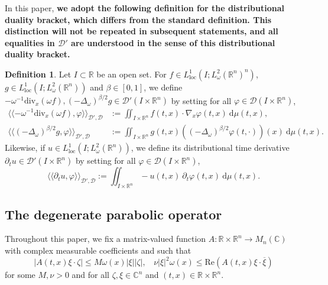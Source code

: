 \documentclass[12pt, letterpaper]{amsart}
\theoremstyle{definition}
\newtheorem{defn}[thm]{Definition}
\theoremstyle{remark}
\newcommand{\llangle}{\langle\!\langle}
\newcommand{\rrangle}{\rangle\!\rangle}
\numberwithin{equation}{section}
\begin{document}
In this paper, \textbf{we adopt the following definition for the distributional duality bracket, which differs from the standard definition. This distinction will not be repeated in subsequent statements, and all equalities in $\mathcal{D'}$ are understood in the sense of this distributional duality bracket.}  
\begin{defn}
    Let $I \subset \mathbb{R}$ be an open set. For $f \in L^{1}_{\mathrm{loc}}(I;L^2_\omega(\mathbb{R}^n)^n)$, $g \in L^{1}_{\mathrm{loc}}(I;L^2_\omega(\mathbb{R}^n))$ and $\beta \in [0,1]$, we define $- \omega^{-1} \mathrm{div}_x(\omega f), (-\Delta_\omega)^{\beta/2}g \in \mathcal{D'}(I\times \mathbb{R}^n)$ by setting for all $\varphi \in \mathcal{D}(I \times \mathbb{R}^n)$,
\begin{align*}
    \llangle - \omega^{-1} \mathrm{div}_x(\omega f) , \varphi \rrangle_{\mathcal{D}',\mathcal{D}}&:=\iint_{I \times \mathbb{R}^n} f(t,x) \cdot \nabla_x \varphi(t,x) \ \mathrm{d}\mu(t,x), \\
    \llangle (-\Delta_\omega)^{\beta/2}g , \varphi \rrangle_{\mathcal{D}',\mathcal{D}}&:=\iint_{I \times \mathbb{R}^n} g(t,x)  ((-\Delta_\omega)^{\beta/2}\varphi(t,\cdot))(x) \ \mathrm{d}\mu(t,x).
\end{align*}
Likewise, if $u \in L^{1}_{\mathrm{loc}}(I;L^2_\omega(\mathbb{R}^n))$, we define its distributional time derivative $\partial_t u \in \mathcal{D'}(I\times \mathbb{R}^n)$ by setting for all $\varphi \in \mathcal{D}(I \times \mathbb{R}^n)$,
\begin{equation*}
    \llangle \partial_t u , \varphi \rrangle_{\mathcal{D}',\mathcal{D}}:=\iint_{I \times \mathbb{R}^n} -u(t,x) \ \partial_t \varphi(t,x) \ \mathrm{d}\mu(t,x).
\end{equation*}
\end{defn}

\subsection{The degenerate parabolic operator}
Throughout this paper, we fix a matrix-valued function $A: \mathbb{R}\times \mathbb{R}^n \rightarrow M_n(\mathbb{C})$ with complex measurable coefficients and such that 
\begin{equation}\label{ellipticité A}
\left | A(t,x)\xi \cdot \zeta  \right |\leq M \omega(x)\left | \xi \right |\left | \zeta  \right |, \ \ \ \  
\nu \left | \xi \right |^2\omega(x)\leq \mathrm{Re}(A(t,x)\xi\cdot \overline{\xi})
\end{equation}
for some $M,\nu>0$ and for all $\zeta, \xi \in \mathbb{C}^n$ and $(t,x) \in \mathbb{R}\times \mathbb{R}^n$.
\end{document}
